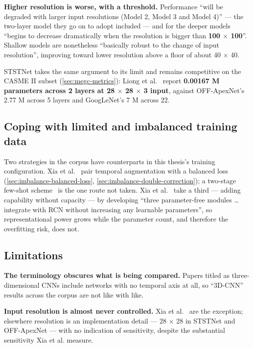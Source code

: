 \textbf{Higher resolution is worse, with a threshold.} Performance ``will be degraded with larger input resolutions (Model 2, Model 3 and Model 4)'' --- the two-layer model they go on to adopt included --- and for the deeper models ``begins to decrease dramatically when the resolution is bigger than \textbf{100 $\times$ 100}''. Shallow models are nonetheless ``basically robust to the change of input resolution'', improving toward lower resolution above a floor of about 40 $\times$ 40.

STSTNet takes the same argument to its limit and remains competitive on the CASME II subset (\autoref{sec:megc-metrics}): Liong et al.~\cite{liong2019b} report \textbf{0.00167 M parameters across 2 layers at 28 $\times$ 28 $\times$ 3 input}, against OFF-ApexNet's 2.77 M across 5 layers and GoogLeNet's 7 M across 22.

\subsection{Coping with limited and imbalanced training data}
\label{sec:cnn-limited-data}

Two strategies in the corpus have counterparts in this thesis's training configuration. Xia et al.~\cite{xia2020a} pair temporal augmentation with a balanced loss (\autoref{sec:imbalance-balanced-loss}, \autoref{sec:imbalance-double-correction}); a two-stage few-shot scheme~\cite{zhaoS2021} is the one route not taken. Xia et al.~\cite{xia2020b} take a third --- adding capability without capacity --- by developing ``three parameter-free modules \ldots integrate with RCN without increasing any learnable parameters'', so representational power grows while the parameter count, and therefore the overfitting risk, does not.

\subsection{Limitations}
\label{sec:cnn-limitations}

\textbf{The terminology obscures what is being compared.} Papers titled as three-dimensional CNNs include networks with no temporal axis at all, so ``3D-CNN'' results across the corpus are not like with like.

\textbf{Input resolution is almost never controlled.} Xia et al.~\cite{xia2020b} are the exception; elsewhere resolution is an implementation detail --- 28 $\times$ 28 in STSTNet and OFF-ApexNet --- with no indication of sensitivity, despite the substantial sensitivity Xia et al. measure.


